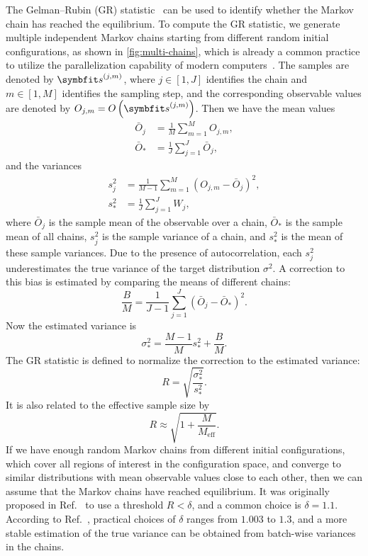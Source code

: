 The Gelman--Rubin (GR) statistic~\cite{gelman1992inference, vats2021revisiting} can be used to identify whether the Markov chain has reached the equilibrium. To compute the GR statistic, we generate multiple independent Markov chains starting from different random initial configurations, as shown in \cref{fig:multi-chains}, which is already a common practice to utilize the parallelization capability of modern computers~\cite{lee2010utility}. The samples are denoted by $\vs^{(j, m)}$, where $j \in [1, J]$ identifies the chain and $m \in [1, M]$ identifies the sampling step, and the corresponding observable values are denoted by $O_{j, m} = O\left( \vs^{(j, m)} \right)$. Then we have the mean values
\begin{align}
\bar{O}_j &= \frac{1}{M} \sum_{m = 1}^M O_{j, m}, \\
\bar{O}_* &= \frac{1}{J} \sum_{j = 1}^J \bar{O}_j,
\end{align}
and the variances
\begin{align}
s^2_j &= \frac{1}{M - 1} \sum_{m = 1}^M (O_{j, m} - \bar{O}_j)^2, \\
s^2_* &= \frac{1}{J} \sum_{j = 1}^J W_j,
\end{align}
where $\bar{O}_j$ is the sample mean of the observable over a chain, $\bar{O}_*$ is the sample mean of all chains, $s^2_j$ is the sample variance of a chain, and $s^2_*$ is the mean of these sample variances. Due to the presence of autocorrelation, each $s^2_j$ underestimates the true variance of the target distribution $\sigma^2$. A correction to this bias is estimated by comparing the means of different chains:
\begin{equation}
\frac{B}{M} = \frac{1}{J - 1} \sum_{j = 1}^J (\bar{O}_j - \bar{O}_*)^2.
\end{equation}
Now the estimated variance is
\begin{equation}
\sigma^2_* = \frac{M - 1}{M} s^2_* + \frac{B}{M}.
\end{equation}
The GR statistic is defined to normalize the correction to the estimated variance:
\begin{equation}
R = \sqrt{\frac{\sigma^2_*}{s^2_*}}.
\end{equation}
It is also related to the effective sample size by
\begin{equation}
R \approx \sqrt{1 + \frac{M}{M_\text{eff}}}.
\end{equation}
If we have enough random Markov chains from different initial configurations, which cover all regions of interest in the configuration space, and converge to similar distributions with mean observable values close to each other, then we can assume that the Markov chains have reached equilibrium. It was originally proposed in Ref.~\cite{gelman1992inference} to use a threshold $R < \delta$, and a common choice is $\delta = 1.1$. According to Ref.~\cite{vats2021revisiting}, practical choices of $\delta$ ranges from $1.003$ to $1.3$, and a more stable estimation of the true variance can be obtained from batch-wise variances in the chains.


